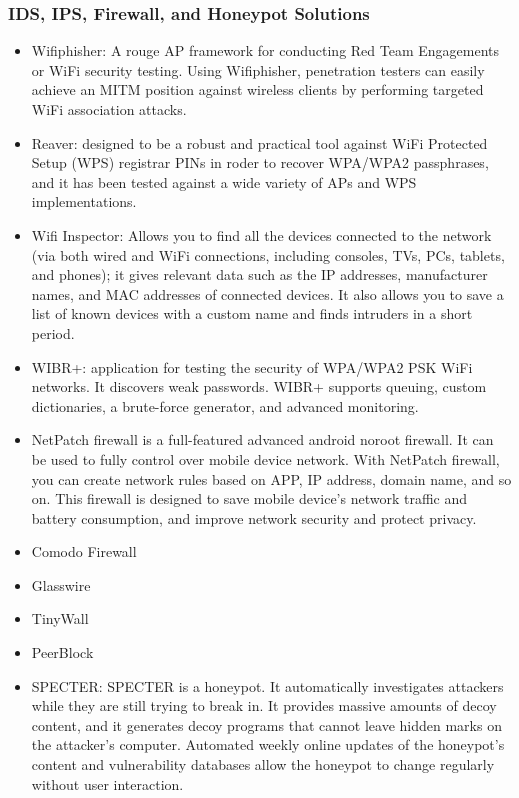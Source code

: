 \subsubsection{IDS, IPS, Firewall, and Honeypot Solutions}
\begin{itemize}
    \item Wifiphisher: A rouge AP framework for conducting Red Team Engagements or WiFi security testing. Using Wifiphisher, penetration testers can easily achieve an MITM position against wireless clients by performing targeted WiFi association attacks.
    \item Reaver: designed to be a robust and practical tool against WiFi Protected Setup (WPS) registrar PINs in roder to recover WPA/WPA2 passphrases, and it has been tested against a wide variety of APs and WPS implementations.
    \item Wifi Inspector: Allows you to find all the devices connected to the network (via both wired and WiFi connections, including consoles, TVs, PCs, tablets, and phones); it gives relevant data such as the IP addresses, manufacturer names, and MAC addresses of connected devices. It also allows you to save a list of known devices with a custom name and finds intruders in a short period.
    \item WIBR+: application for testing the security of WPA/WPA2 PSK WiFi networks. It discovers weak passwords. WIBR+ supports queuing, custom dictionaries, a brute-force generator, and advanced monitoring.
    \item NetPatch firewall is a full-featured advanced android noroot firewall. It can be used to fully control over mobile device network. With NetPatch firewall, you can create network rules based on APP, IP address, domain name, and so on. This firewall is designed to save mobile device's network traffic and battery consumption, and improve network security and protect privacy.
    \item Comodo Firewall
    \item Glasswire
    \item TinyWall
    \item PeerBlock
    \item SPECTER: SPECTER is a honeypot. It automatically investigates attackers while they are still trying to break in. It provides massive amounts of decoy content, and it generates decoy programs that cannot leave hidden marks on the attacker's computer. Automated weekly online updates of the honeypot's content and vulnerability databases allow the honeypot to change regularly without user interaction.

\end{itemize}
